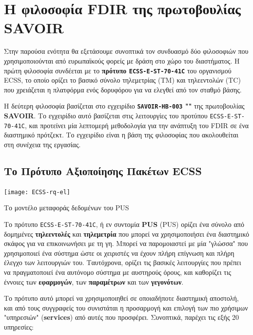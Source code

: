 \documentclass[a4paper,nobib]{tufte-book}
\begin{document}
\chapter{Η φιλοσοφία \acs{FDIR} της πρωτοβουλίας SAVOIR}
\label{cap:savoir}

Στην παρούσα ενότητα θα εξετάσουμε συνοπτικά τον συνδυασμό δύο φιλοσοφιών που χρησιμοποιούνται από ευρωπαϊκούς φορείς με δράση στο χώρο του διαστήματος. Η πρώτη φιλοσοφία συνδέεται με το \textbf{πρότυπο \texttt{ECSS-E-ST-70-41C}} \autocite{ECSS-E-ST-70-41C} του οργανισμού \acf{ECSS}, το οποίο ορίζει το βασικό σύνολο τηλεμετρίας (\acs{TM}) και τηλεεντολών (\acs{TC}) που χρειάζεται η πλατφόρμα ενός δορυφόρου για να ελεγθεί από τον σταθμό βάσης.

Η δεύτερη φιλοσοφία βασίζεται στο εγχειρίδιο \textbf{\texttt{SAVOIR-HB-003} ""} \autocite{SAVOIR-HB-003} της πρωτοβουλίας \textbf{\acf{SAVOIR}}. Το εγχειρίδιο αυτό βασίζεται στις λειτουργίες του προτύπου \texttt{ECSS-E-ST-70-41C}, και προτείνει μία λεπτομερή μεθοδολογία για την ανάπτυξη του \ac{FDIR} σε ένα διαστημικό πρότζεκτ. Το εγχειρίδιο είναι η βάση της φιλοσοφίας που ακολουθείται στη συνέχεια της εργασίας.

\section{Το Πρότυπο Αξιοποίησης Πακέτων \acs{ECSS}}
\label{sec:pus}

\begin{marginfigure}
	\texttt{[image: ECSS-rq-el]}
	\caption[]{Το μοντέλο μεταφοράς δεδομένων του \ac{PUS}}
	\label{fig:pusmodel}
\end{marginfigure}

Το πρότυπο \texttt{ECSS-E-ST-70-41C}, ή εν συντομία \textbf{\acs{PUS}} (\acl{PUS}) ορίζει ένα σύνολο από δομημένες \textbf{τηλεεντολές} και \textbf{τηλεμετρία} που μπορεί να χρησιμοποιήσει ένα διαστημικό σκάφος για να επικοινωνήσει με τη γη. Μπορεί να παρομοιαστεί με μία "γλώσσα" που χρησιμοποιεί ένα σύστημα ώστε οι χειριστές να έχουν πλήρη επίγνωση και πλήρη έλεγχο των λειτουργιών του. Ταυτόχρονα, ορίζει τις βασικές λειτουργίες που πρέπει να πραγματοποιεί ένα αυτόνομο σύστημα με αυστηρούς όρους, και καθορίζει τις έννοιες των \textbf{εφαρμογών}, των \textbf{παραμέτρων} και των \textbf{γεγονότων}.

Το πρότυπο αυτό μπορεί να χρησιμοποιηθεί σε οποιαδήποτε διαστημική αποστολή, και από τους συγγραφείς του συνιστάται η προσαρμογή και επιλογή των πιο χρήσιμων "υπηρεσιών" (\textbf{services}) από αυτές που προσφέρει. Συνοπτικά, παρέχει τις εξής 20 υπηρεσίες: \autocite{ECSS-E-ST-70-41C,ECSS-E-70-41A,kaufeler_esa_standard_1994}
\end{document}
